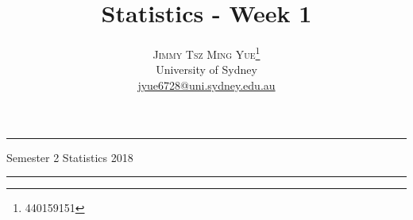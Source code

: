 \documentclass[twoside]{article}
\title{\vspace{-15mm}\fontsize{24pt}{10pt}\selectfont\textbf{Statistics - Week 1}} %
\author{
\large
\textsc{Jimmy Tsz Ming Yue}\thanks{440159151}\\[2mm] %
\normalsize University of Sydney \\ %
\normalsize \href{mailto:jyue6728@uni.sydney.edu.au}{jyue6728@uni.sydney.edu.au} %
\vspace{-5mm}
}
\date{}
\theoremstyle{definition}
\theoremstyle{definition}
\begin{document}
\maketitle %

\thispagestyle{fancy} %
\hrule \smallskip

\noindent Semester 2 \quad Statistics \hspace{10.5
cm} 2018
\smallskip
\hrule
\smallskip
\tableofcontents
\end{document}

